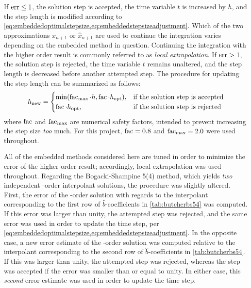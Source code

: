 If $\operatorname{err}\leq1$, the solution step is accepted, the time variable $t$ is
increased by $h$, and the step length is modified according to
\cref{eq:embeddedoptimalstepsize,eq:embeddedstepsizeadjustment}. Which of the
two approximations $x_{n+1}$ or $\widehat{x}_{n+1}$ are used to continue the
integration varies depending on the embedded method in question. Continuing the
integration with the higher order result is commonly referred to as
\emph{local extrapolation}. If $\operatorname{err}>1$, the solution step is rejected, the
time variable $t$ remains unaltered, and the step length is decreased before
another attempted step. The procedure for updating the step length can be
summarized as follows:
\begin{equation}
    \label{eq:embeddedstepsizeadjustment}
h_{\mathrm{new}}=\begin{cases}%
    \min(\facem_{\mathrm{max}}\cdot{}h,\facem\cdot{}h_{\mathrm{opt}}),&
\textnormal{if the solution step is accepted}\\
\facem\cdot{}h_{\mathrm{opt}},&\textnormal{if the solution step is rejected}%
\end{cases}
\end{equation}
where $\operatorname{fac}$ and $\operatorname{fac}_{\mathrm{max}}$ are numerical safety factors,
intended to prevent increasing the step size \emph{too} much. For this project,
$\operatorname{fac}=0.8$ and $\operatorname{fac}_{\mathrm{max}}=2.0$ were used throughout.

All of the embedded methods considered here are tuned in order to minimize
the error of the higher order result; accordingly, local extrapolation was
used throughout. Regarding the Bogacki-Shampine 5(4) method, which yields
\emph{two} independent -order interpolant solutions, the procedure was
slightly altered. First, the error of the -order solution with regards to
the interpolant corresponding to the first row of $\widehat{b}$-coefficients in
\cref{tab:butcherbs54} was computed. If this error was larger than unity,
the attempted step was rejected, and the same error was used in order to
update the time step, per
\cref{eq:embeddedoptimalstepsize,eq:embeddedstepsizeadjustment}. In the
opposite case, a new error estimate of the -order solution was computed
relative to the interpolant corresponding to the second row of
$\widehat{b}$-coefficients in \cref{tab:butcherbs54}. If this was larger than
unity, the attempted step was rejected, whereas the step was accepted if the
error was smaller than or equal to unity. In either case, this \emph{second}
error estimate was used in order to update the time step.
